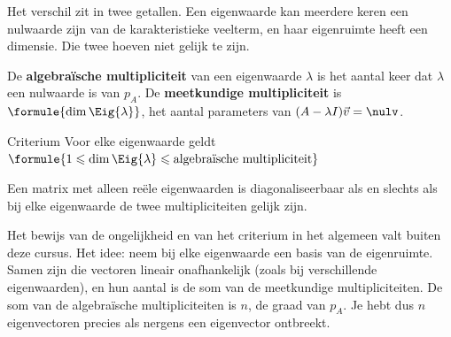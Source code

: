 Het verschil zit in twee getallen. Een eigenwaarde kan meerdere keren een nulwaarde zijn van de karakteristieke veelterm, en haar eigenruimte heeft een dimensie. Die twee hoeven niet gelijk te zijn.

\begin{theorie}
De \textbf{\textcolor{accent}{algebraïsche multipliciteit}} van een eigenwaarde $\lambda$ is het aantal keer dat $\lambda$ een nulwaarde is van $p_A$. De \textbf{\textcolor{accent}{meetkundige multipliciteit}} is $\formule{\dim \Eig{\lambda}}$, het aantal parameters van $(A - \lambda I)\vec v = \nulv$.

\begin{stelling}{Criterium}
Voor elke eigenwaarde geldt \quad $\formule{1 \leqslant \dim \Eig{\lambda} \leqslant \text{algebraïsche multipliciteit}}$

\vspace{1mm}
Een matrix met alleen reële eigenwaarden is diagonaliseerbaar als en slechts als bij elke eigenwaarde de twee multipliciteiten gelijk zijn.
\end{stelling}
\end{theorie}

Het bewijs van de ongelijkheid en van het criterium in het algemeen valt buiten deze cursus. Het idee: neem bij elke eigenwaarde een basis van de eigenruimte. Samen zijn die vectoren lineair onafhankelijk (zoals bij verschillende eigenwaarden), en hun aantal is de som van de meetkundige multipliciteiten. De som van de algebraïsche multipliciteiten is $n$, de graad van $p_A$. Je hebt dus $n$ eigenvectoren precies als nergens een eigenvector ontbreekt.



